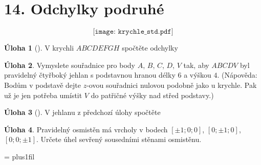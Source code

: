 \documentclass[10pt,a5paper]{extarticle}
\newcommand{\hint}[1]{{\color{gray}\footnotesize\noindent(Nápověda: #1)}}
\def\tisk{%
\newbox\shipouthackbox
\pdfpagewidth=2\pdfpagewidth
\let\oldshipout=\shipout
\def\shipout{\afterassignment\zdvojtmp \setbox\shipouthackbox=}%
\def\zdvojtmp{\aftergroup\zdvoj}%
\def\zdvoj{%
    \oldshipout\vbox{\hbox{%
        \copy\shipouthackbox
        \hskip\dimexpr .5\pdfpagewidth-\wd\shipouthackbox\relax
        \box\shipouthackbox
    }}%
}}%
\let\results\newpage
\let\endresults\relax
\def\resultssame{%
    \long\def\results##1\endresults{%
        \vfill\noindent\rotatebox{180}{\vbox{##1}}%
    }%
}
\theoremstyle{definition}
\newtheorem{uloha}{\atr Úloha}
\let\ee\expandafter
\def\vysld{}
\let\printvysl\relax
\def\locvysl#1{\ee\gdef\ee\locvysld\ee{\locvysld\item #1}}
\let\lv\locvysl
\newenvironment{ulohav}[1][]{\begin{uloha}[#1]\gdef\locvysld{\begin{enumerate*}}}{\ee\vyslplain\ee{\locvysld\end{enumerate*}}\end{uloha}}
\def\atr{}
\begin{document}

\section*{14. Odchylky podruhé}

\[ \texttt{[image: krychle\_std.pdf]} \]


\begin{ulohav}V krychli $ABCDEFGH$ spočtěte odchylky
\end{ulohav}


\begin{uloha}
Vymyslete  souřadnice pro body $A$, $B$, $C$, $D$, $V$ tak, aby $ABCDV$ byl pravidelný čtyřboký jehlan s podstavnou hranou délky $6$ a výškou $4$. \hint{Bodům v podstavě dejte $z$-ovou souřadnici nulovou podobně jako u krychle. Pak už je jen potřeba umístit $V$ do patřičné výšky nad střed podstavy.}
\end{uloha}


\begin{ulohav}
V jehlanu z předchozí úlohy spočtěte
\end{ulohav}


\begin{uloha}
Pravidelný osmistěn má vrcholy v bodech $[\pm 1; 0; 0]$, $[0; \pm 1; 0]$, $[0; 0; \pm 1]$. Určete úhel sevřený sousedními stěnami osmistěnu.
\end{uloha}

\baselineskip
{}

\results
\parindent=0pt
\parskip=\smallskipamount
\rightskip=0pt plus1fil\relax
\def\printvysl#1#2{\textbf{#1.} #2\par}
\vysld
\endresults
\end{document}

